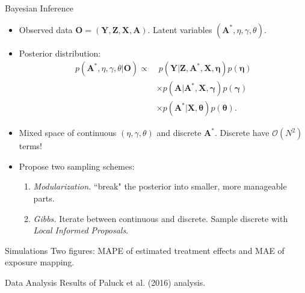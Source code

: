 \documentclass{beamer}
\def \bZ {\textbf{Z}}
\def \bA {\textbf{A}}
\def \bX {\textbf{X}}
\def \bY {\textbf{Y}}
\def \bO {\textbf{O}}
\def \boeta {\boldsymbol{\eta}}
\def \bgamma {\boldsymbol{\gamma}}
\def \btheta {\boldsymbol{\theta}}
\begin{document}
    \begin{frame}{Bayesian Inference}
        \large
        \begin{itemize}
            \item<1-> Observed data $\bO = (\bY,\bZ,\bX,\bA)$. Latent variables $(\bA^\ast, \eta,\gamma,\theta)$.
            \vspace{0.2cm}
            \item<2-> Posterior distribution:
            \begin{equation*}
                \begin{split}
                    p(\bA^\ast, \eta,\gamma,\theta \vert \bO) 
                        \propto
                    &\;
                    p(\bY \vert \bZ,\bA^\ast,\bX,\boeta) p(\boeta) 
                    \\ & \times
                    p(\bA \vert \bA^\ast, \bX,\bgamma) p(\bgamma)
                    \\ & \times 
                    p(\bA^\ast \vert \bX,\btheta) p(\btheta).
                \end{split}
            \end{equation*} 
            \item<3-> Mixed space of continuous $(\eta,\gamma,\theta)$ and discrete $\bA^\ast$. Discrete have $\mathcal{O}(N^2)$ terms!
            \item<4-> Propose two sampling schemes:
            \begin{enumerate}
                \item \emph{Modularization.} ``break" the posterior into smaller, more manageable parts.
                \vspace{0.1cm}
                \item \emph{Gibbs.} Iterate between continuous and discrete. Sample discrete with \emph{Local Informed Proposals}.
            \end{enumerate} 
        \end{itemize}
    \end{frame}

    \begin{frame}{Simulations}
        Two figures: MAPE of estimated treatment effects and MAE of exposure mapping.        
    \end{frame}

    \begin{frame}{Data Analysis}
        Results of Paluck et al. (2016) analysis.
    \end{frame}
\end{document}
